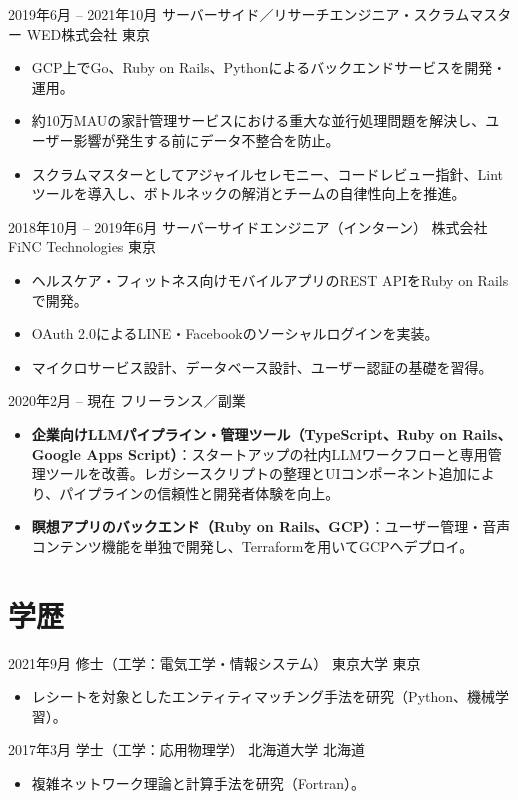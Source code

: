 \documentclass[10pt,a4paper]{moderncv}
\begin{document}
\newpage
\cventry
    {2019年6月 -- 2021年10月}
    {サーバーサイド／リサーチエンジニア・スクラムマスター}
    {WED株式会社}
    {東京}
    {}
    {
      \begin{itemize}
        \item GCP上でGo、Ruby on Rails、Pythonによるバックエンドサービスを開発・運用。
        \item 約10万MAUの家計管理サービスにおける重大な並行処理問題を解決し、ユーザー影響が発生する前にデータ不整合を防止。
        \item スクラムマスターとしてアジャイルセレモニー、コードレビュー指針、Lintツールを導入し、ボトルネックの解消とチームの自律性向上を推進。
      \end{itemize}
    }

\cventry
    {2018年10月 -- 2019年6月}
    {サーバーサイドエンジニア（インターン）}
    {株式会社FiNC Technologies}
    {東京}
    {}
    {
      \begin{itemize}
        \item ヘルスケア・フィットネス向けモバイルアプリのREST APIをRuby on Railsで開発。
        \item OAuth 2.0によるLINE・Facebookのソーシャルログインを実装。
        \item マイクロサービス設計、データベース設計、ユーザー認証の基礎を習得。
      \end{itemize}
    }

\cventry
    {2020年2月 -- 現在}
    {フリーランス／副業}
    {}
    {}
    {}
    {
      \begin{itemize}
        \item \textbf{企業向けLLMパイプライン・管理ツール（TypeScript、Ruby on Rails、Google Apps Script）}：スタートアップの社内LLMワークフローと専用管理ツールを改善。レガシースクリプトの整理とUIコンポーネント追加により、パイプラインの信頼性と開発者体験を向上。
        \item \textbf{瞑想アプリのバックエンド（Ruby on Rails、GCP）}：ユーザー管理・音声コンテンツ機能を単独で開発し、Terraformを用いてGCPへデプロイ。
      \end{itemize}
    }

\section{学歴}

\cventry
    {2021年9月}
    {修士（工学：電気工学・情報システム）}
    {東京大学}
    {東京}
    {}
    {
      \begin{itemize}
        \item レシートを対象としたエンティティマッチング手法を研究（Python、機械学習）。
      \end{itemize}
    }

\cventry
    {2017年3月}
    {学士（工学：応用物理学）}
    {北海道大学}
    {北海道}
    {}
    {
      \begin{itemize}
        \item 複雑ネットワーク理論と計算手法を研究（Fortran）。
      \end{itemize}
    }
\end{document}
